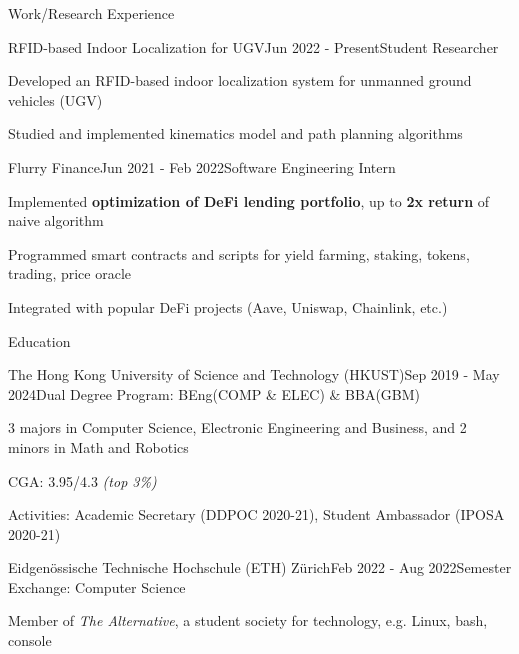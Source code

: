 \documentclass{resume}
\begin{document}
\begin{rSection}{Work/Research Experience}
    
    \begin{rSubsection}{RFID-based Indoor Localization for UGV}{Jun 2022 - Present}{Student Researcher}{}
        \item Developed an RFID-based indoor localization system for unmanned ground vehicles (UGV)
        \item Studied and implemented kinematics model and path planning algorithms
    \end{rSubsection}
    
    \begin{rSubsection}{Flurry Finance}{Jun 2021 - Feb 2022}{Software Engineering Intern}{}
        \item Implemented \textbf{optimization of DeFi lending portfolio}, up to \textbf{2x return} of naive algorithm
        \item Programmed smart contracts and scripts for yield farming, staking, tokens, trading, price oracle
        \item Integrated with popular DeFi projects (Aave, Uniswap, Chainlink, etc.)
    \end{rSubsection}
    
\end{rSection}

\begin{rSection}{Education}

    \begin{rSubsection}{The Hong Kong University of Science and Technology (HKUST)}{Sep 2019 - May 2024}{Dual Degree Program: BEng(COMP \& ELEC) \& BBA(GBM)}{}
        \item 3 majors in Computer Science, Electronic Engineering and Business, and 2 minors in Math and Robotics
        \item CGA: 3.95/4.3 \emph{(top 3\%)}
        \item Activities: Academic Secretary (DDPOC 2020-21), Student Ambassador (IPOSA 2020-21)
    \end{rSubsection}

    \begin{rSubsection}{Eidgenössische Technische Hochschule (ETH) Zürich}{Feb 2022 - Aug 2022}{Semester Exchange: Computer Science}{}
        \item Member of \emph{The Alternative}, a student society for technology, e.g. Linux, bash, console
    \end{rSubsection}

\end{rSection}
\end{document}
